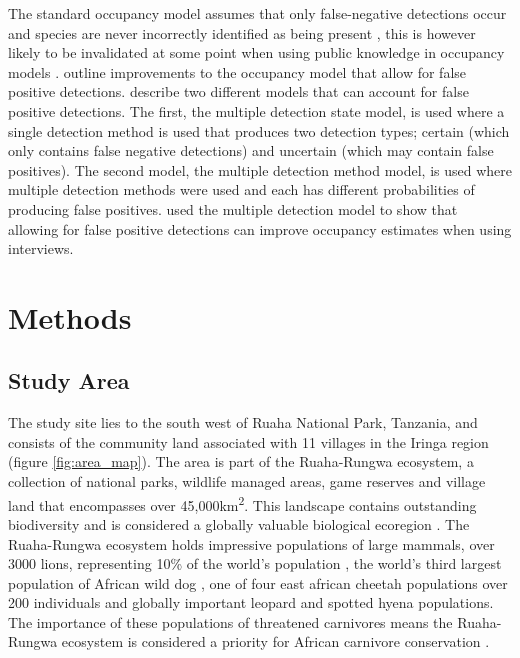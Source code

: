 The standard occupancy model assumes that only false-negative detections occur and species are never incorrectly identified as being present \cite{mackenzie2017occupancy}, this is however likely to be invalidated at some point when using public knowledge in occupancy models \cite{Pillay2013}. \citet{Miller_2011} outline improvements to the occupancy model that allow for false positive detections. \citet{Miller_2011} describe two different models that can account for false positive detections. The first, the multiple detection state model, is used where a single detection method is used that produces two detection types; certain (which only contains false negative detections) and uncertain (which may contain false positives). The second model, the multiple detection method model, is used where multiple detection methods were used and each has different probabilities of producing false positives. \cite{Pillay2013} used the multiple detection model to show that allowing for false positive detections can improve occupancy estimates when using interviews.

\section{Methods}
\subsection{Study Area}
The study site lies to the south west of Ruaha National Park, Tanzania, and consists of the community land associated with 11 villages in the Iringa region (figure \ref{fig:area_map}). The area is part of the Ruaha-Rungwa ecosystem, a collection of national parks, wildlife managed areas, game reserves and village land that encompasses over 45,000km\textsuperscript{2}. This landscape contains outstanding biodiversity and is considered a globally valuable biological ecoregion \cite{Olson_1998}. The Ruaha-Rungwa ecosystem holds impressive populations of large mammals, over 3000 lions, representing 10\% of the world's population \cite{Riggio_2012}, the world's third largest population of African wild dog \cite{iucn2007regional}, one of four east african cheetah populations over 200 individuals \cite{iucn2007regional} and globally important leopard and spotted hyena populations. The importance of these populations of threatened carnivores means the Ruaha-Rungwa ecosystem is considered a priority for African carnivore conservation \cite{mills2001geographic}.\\

